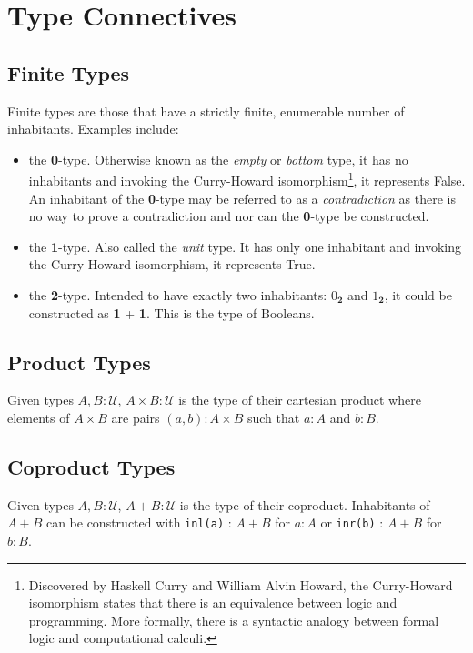 \documentclass[12pt]{report}
\begin{document}
\section{Type Connectives}
\subsection{Finite Types}
Finite types are those that have a strictly finite, enumerable number of inhabitants. Examples include:
\begin{itemize}
\item the \textbf{0}-type. Otherwise known as the \textit{empty} or \textit{bottom} type, it has no inhabitants and invoking the Curry-Howard isomorphism\footnote{

Discovered by Haskell Curry and William Alvin Howard, the Curry-Howard isomorphism states that there is an equivalence between logic and programming. More formally, there is a syntactic analogy between formal logic and computational calculi.

}, it represents False. An inhabitant of the \textbf{0}-type may be referred to as a \textit{contradiction} as there is no way to prove a contradiction and nor can the \textbf{0}-type be constructed.
\item the \textbf{1}-type. Also called the \textit{unit} type. It has only one inhabitant and invoking the Curry-Howard isomorphism, it represents True. 
\item the \textbf{2}-type. Intended to have exactly two inhabitants: $0_\textbf{2}$ and $1_\textbf{2}$, it could be constructed as \textbf{1} + \textbf{1}. This is the type of Booleans.
\end{itemize}

\subsection{Product Types}
Given types $A,B : \mathcal{U}$, $A \times B : \mathcal{U}$ is the type of their cartesian product where elements of $A \times B$ are pairs $(a,b) : A \times B$ such that $a : A$ and $b : B$. 

\subsection{Coproduct Types}
Given types $A,B : \mathcal{U}$, $A + B : \mathcal{U}$ is the type of their coproduct. Inhabitants of $A + B$ can be constructed with \texttt{inl(a)} : $A + B$ for $a : A$ or \texttt{inr(b)} : $A + B$ for $b : B$.
\end{document}
